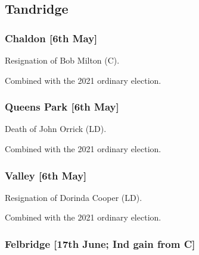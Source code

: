 \documentclass[a4paper,openany]{book}
\begin{document}
\begin{resultsiii}
\subsection*{Tandridge}

\subsubsection*{Chaldon \hspace*{\fill}\nolinebreak[1]%
	\enspace\hspace*{\fill}
	[6th May]}


Resignation of Bob Milton (C).

Combined with the 2021 ordinary election.

\subsubsection*{Queens Park \hspace*{\fill}\nolinebreak[1]%
	\enspace\hspace*{\fill}
	[6th May]}


Death of John Orrick (LD).

Combined with the 2021 ordinary election.

\subsubsection*{Valley \hspace*{\fill}\nolinebreak[1]%
	\enspace\hspace*{\fill}
	[6th May]}


Resignation of Dorinda Cooper (LD).

Combined with the 2021 ordinary election.

\subsubsection*{Felbridge \hspace*{\fill}\nolinebreak[1]%
	\enspace\hspace*{\fill}
	[17th June; Ind gain from C]}



\end{resultsiii}
\end{document}
